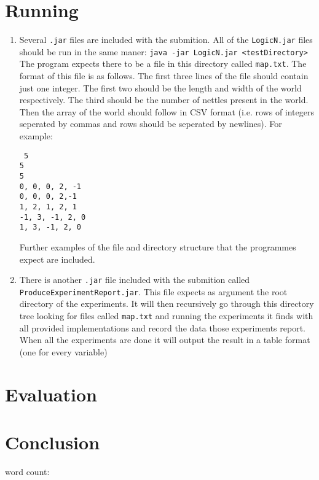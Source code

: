 \documentclass[british]{article}
\newcommand{\code}[1]{\texttt{#1}}
\begin{document}
\section{Running}
\label{running}
\begin{enumerate}
\item  Several \code{.jar} files are included with the submition. All of the \code{LogicN.jar} files should be run in the same maner: \code{java -jar LogicN.jar <testDirectory>} The program expects there to be a file in this directory called \code{map.txt}. The format of this file is as follows. The first three lines of the file should contain just one integer. The first two should be the length and width of the world respectively. The third should be the number of nettles present in the world. Then the array of the world should follow in CSV format (i.e. rows of integers seperated by commas and rows should be seperated by newlines). For example: \begin{lstlisting} 5
5
5
0, 0, 0, 2, -1
0, 0, 0, 2,-1
1, 2, 1, 2, 1
-1, 3, -1, 2, 0
1, 3, -1, 2, 0
 \end{lstlisting} Further examples of the file and directory structure that the programmes expect are included.
\item There is another \code{.jar} file included with the submition called \code{ProduceExperimentReport.jar}. This file expects as argument the root directory of the experiments. It will then recursively go through this directory tree looking for files called \code{map.txt}  and running the experiments it finds with all provided implementations and record the data those experiments report. When all the experiments are done it will output the result in a table format (one for every variable)   
\end{enumerate}
 
\section{Evaluation}
\label{evals}


\section{Conclusion}
\label{conclusion}

 
 
word count:
{}

\end{document}
